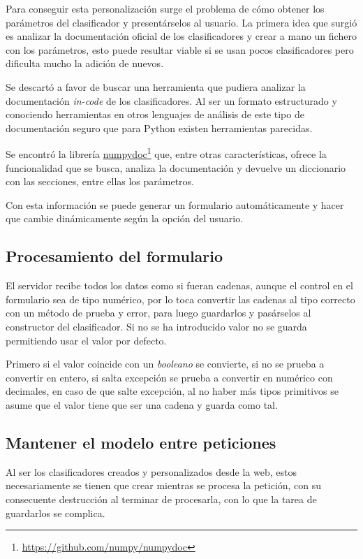 Para conseguir esta personalización surge el problema de cómo obtener los
parámetros del clasificador y presentárselos al usuario. La primera idea que
surgió es analizar la documentación oficial de los clasificadores y crear a mano
un fichero con los parámetros, esto puede resultar viable si se usan pocos
clasificadores pero dificulta mucho la adición de nuevos.

Se descartó a favor de buscar una herramienta que pudiera analizar la
documentación \textit{in-code} de los clasificadores. Al ser un formato
estructurado y conociendo herramientas en otros lenguajes de análisis de este
tipo de documentación seguro que para Python existen herramientas parecidas.

Se encontró la librería
\href{https://github.com/numpy/numpydoc}{numpydoc}\footnote{\url{https://github.com/numpy/numpydoc}}
que, entre otras características, ofrece la funcionalidad que se busca, analiza
la documentación y devuelve un diccionario con las secciones, entre ellas los
parámetros.

Con esta información se puede generar un formulario automáticamente y hacer que
cambie dinámicamente según la opción del usuario.

\subsection{Procesamiento del formulario}

El servidor recibe todos los datos como si fueran cadenas, aunque el control en
el formulario sea de tipo numérico, por lo toca convertir las cadenas al tipo
correcto con un método de prueba y error, para luego guardarlos y pasárselos al
constructor del clasificador. Si no se ha introducido valor no se guarda
permitiendo usar el valor por defecto.

Primero si el valor coincide con un \textit{booleano} se convierte, si no se
prueba a convertir en entero, si salta excepción se prueba a convertir en
numérico con decimales, en caso de que salte excepción, al no haber más tipos
primitivos se asume que el valor tiene que ser una cadena y guarda como tal.

\subsection{Mantener el modelo entre peticiones}

Al ser los clasificadores creados y personalizados desde la web, estos
necesariamente se tienen que crear mientras se procesa la petición, con su
consecuente destrucción al terminar de procesarla, con lo que la tarea de
guardarlos se complica.

